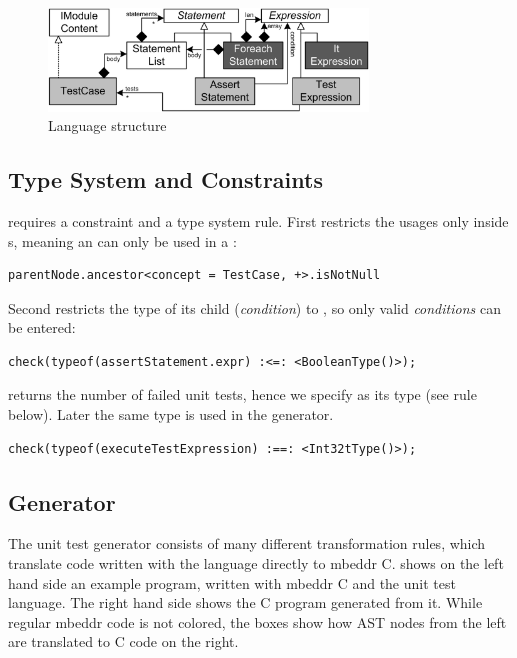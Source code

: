 \begin{figure}[h]
  \vspace{-2mm}
  \centering
    \includegraphics[width=8.5cm]{./figures/umldiag.png} 
    \vspace{-2mm}
    \caption{Language structure}
  \label{fig:UnitTestStructure}
  \vspace{-2mm}
\end{figure}

\subsection{Type System and Constraints}

 requires a constraint and a type
system rule. First restricts the usages only inside s, meaning an
 can only be used in a :
\begin{lstlisting}[language=mbeddr,frame=single]
parentNode.ancestor<concept = TestCase, +>.isNotNull
\end{lstlisting}

Second restricts the type of its child  (\emph{condition}) to
, so only valid \emph{conditions} can be entered:
\begin{lstlisting}[language=mbeddr,frame=single]
check(typeof(assertStatement.expr) :<=: <BooleanType()>);
\end{lstlisting}

 returns the number of failed unit tests,  
hence we specify  as its type (see rule below). Later the same
type is used in the generator.

\begin{lstlisting}[language=mbeddr,frame=single]
check(typeof(executeTestExpression) :==: <Int32tType()>);
\end{lstlisting}


\subsection{Generator}

The unit test generator consists of many different transformation rules, which translate  
code written with the language directly to mbeddr C.  shows
on the left hand side an example program, written with mbeddr C and the unit
test language. The right hand side shows the C program generated from it. While
regular mbeddr code is not colored, the boxes show how \ac{AST} nodes from the
left are translated to C code on the right.

